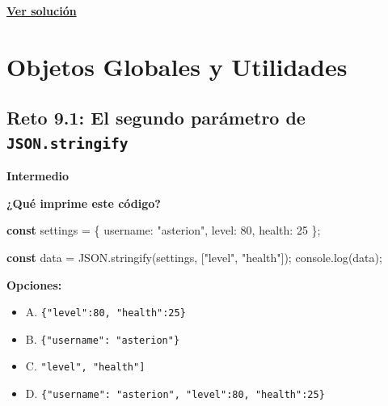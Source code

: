 \documentclass[
  letterpaper,
  DIV=11,
  numbers=noendperiod]{scrreprt}
\newenvironment{Shaded}{\begin{snugshade}}{\end{snugshade}}
\newcommand{\BuiltInTok}[1]{\textcolor[rgb]{0.00,0.23,0.31}{#1}}
\newcommand{\DataTypeTok}[1]{\textcolor[rgb]{0.68,0.00,0.00}{#1}}
\newcommand{\DecValTok}[1]{\textcolor[rgb]{0.68,0.00,0.00}{#1}}
\newcommand{\FunctionTok}[1]{\textcolor[rgb]{0.28,0.35,0.67}{#1}}
\newcommand{\KeywordTok}[1]{\textcolor[rgb]{0.00,0.23,0.31}{\textbf{#1}}}
\newcommand{\NormalTok}[1]{\textcolor[rgb]{0.00,0.23,0.31}{#1}}
\newcommand{\OperatorTok}[1]{\textcolor[rgb]{0.37,0.37,0.37}{#1}}
\newcommand{\StringTok}[1]{\textcolor[rgb]{0.13,0.47,0.30}{#1}}
\providecommand{\tightlist}{%
  \setlength{\itemsep}{0pt}\setlength{\parskip}{0pt}}
\begin{document}
\textbf{\hyperref[sec-sol-cap8-reto4]{Ver solución}}

\chapter{Objetos Globales y
Utilidades}\label{objetos-globales-y-utilidades}

\section{\texorpdfstring{Reto 9.1: El segundo parámetro de
\texttt{JSON.stringify}}{Reto 9.1: El segundo parámetro de JSON.stringify}}\label{sec-cap9-reto1}

\begin{tcolorbox}[enhanced jigsaw, left=2mm, toprule=.15mm, leftrule=.75mm, breakable, colback=white, coltitle=black, bottomtitle=1mm, arc=.35mm, rightrule=.15mm, colframe=quarto-callout-caution-color-frame, opacitybacktitle=0.6, toptitle=1mm, opacityback=0, titlerule=0mm, title=\textcolor{quarto-callout-caution-color}{\faFire}\hspace{0.5em}{Dificultad}, bottomrule=.15mm, colbacktitle=quarto-callout-caution-color!10!white]

\textbf{Intermedio}

\end{tcolorbox}

\textbf{¿Qué imprime este código?}

\begin{Shaded}
\begin{Highlighting}[]
\KeywordTok{const}\NormalTok{ settings }\OperatorTok{=}\NormalTok{ \{}
  \DataTypeTok{username}\OperatorTok{:} \StringTok{"asterion"}\OperatorTok{,}
  \DataTypeTok{level}\OperatorTok{:} \DecValTok{80}\OperatorTok{,}
  \DataTypeTok{health}\OperatorTok{:} \DecValTok{25}
\NormalTok{\}}\OperatorTok{;}

\KeywordTok{const}\NormalTok{ data }\OperatorTok{=} \BuiltInTok{JSON}\OperatorTok{.}\FunctionTok{stringify}\NormalTok{(settings}\OperatorTok{,}\NormalTok{ [}\StringTok{"level"}\OperatorTok{,} \StringTok{"health"}\NormalTok{])}\OperatorTok{;}
\BuiltInTok{console}\OperatorTok{.}\FunctionTok{log}\NormalTok{(data)}\OperatorTok{;}
\end{Highlighting}
\end{Shaded}

\textbf{Opciones:}

\begin{itemize}
\tightlist
\item
  A.
  \texttt{\textquotesingle{}\{"level":80,\ "health":25\}\textquotesingle{}}
\item
  B.
  \texttt{\textquotesingle{}\{"username":\ "asterion"\}\textquotesingle{}}
\item
  C.
  \texttt{\textquotesingle{}{[}"level",\ "health"{]}\textquotesingle{}}
\item
  D.
  \texttt{\textquotesingle{}\{"username":\ "asterion",\ "level":80,\ "health":25\}\textquotesingle{}}
\end{itemize}
\end{document}
